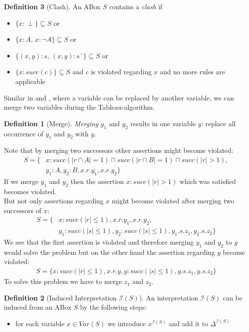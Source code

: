 \documentclass[a4paper,11pt]{scrartcl}
\theoremstyle{break}
\theoremstyle{definition}
\newtheorem{mydef}{Definition}
\begin{document}
\begin{mydef}[Clash]
An ABox $S$ contains a \textit{clash} if
\begin{itemize}
\item $\{x:\perp\}\subseteq S$ or
\item $\{x:A,\,x:\neg A\}\subseteq S$ or
\item $\{(x,y):s,\,(x,y):s^\neg\}\subseteq S$ or
\item $\{x:succ(c)\}\subseteq S$ and $c$ is violated regarding $x$ and no more rules are applicable
\end{itemize}
Similar in \cite{1} and \cite{6}, where a variable can be replaced by another variable, we can merge two variables during the Tableau-algorithm.
\begin{mydef}[Merge]
\textit{Merging} $y_1$ and $y_2$ results in one variable $y$: replace all occurrence of $y_1$ and $y_2$ with $y$. 
\end{mydef}
Note that by merging two successors other assertions might become violated:
\begin{align}
S=\{&x:succ(|r\cap A|=1)\sqcap succ(|r\cap B|=1)\sqcap succ(|r|>1),\nonumber\\ &y_1:A, y_2:B, x.r.y_1, x.r.y_2\}
\end{align}
If we merge $y_1$ and $y_2$ then the assertion $x:succ(|r|>1)$ which was satisfied becomes violated.\\
But not only assertions regarding $x$ might become violated after merging two successors of $x$: 
\begin{align}
S=\{&x:succ(|r|\leq 1), x.r.y_1, x.r.y_2,\nonumber
\\&y_1:succ(|s|\leq 1), y_2:succ(|s|\leq 1), y_1.s.z_1, y_2.s.z_2\}
\end{align}
We see that the first assertion is violated and therefore merging $y_1$ and $y_2$ to $y$ would solve the problem but on the other hand the assertion regarding $y$ become violated: 
\begin{align*}
S=\{x:succ(|r|\leq 1), x.r.y,
y:succ(|s|\leq 1), y.s.z_1, y.s.z_2\}
\end{align*}
To solve this problem we have to merge $z_1$ and $z_2$.
\begin{mydef}[Induced Interpretation $\mathcal{I}(S)$]
An interpretation $\mathcal{I}(S)$ can be induced from an ABox $S$ by the following steps:
\begin{itemize}
\item for each variable $x\in Var(S)$ we introduce $x^{\mathcal{I}(S)}$ and add it to $\Delta^{\mathcal{I}(S)}$

\end{itemize}
\end{mydef}
\end{mydef}
\end{document}
